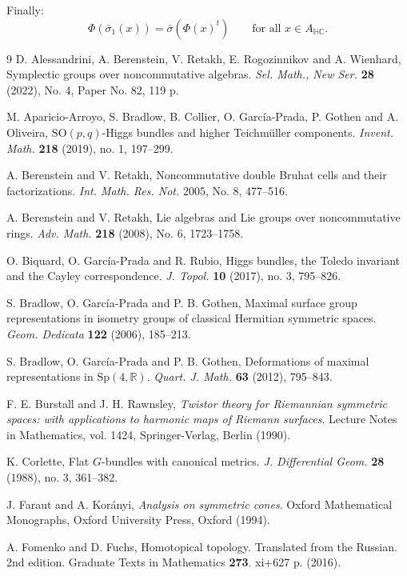 \documentclass[oneside,11pt]{amsart}
\theoremstyle{definition}
\theoremstyle{remark}
\numberwithin{thm}{section}
\numberwithin{equation}{section}
\begin{document}
Finally:
\[
\Phi(\bar\sigma_1(x))
=
\bar\sigma\!\left({\Phi(x)}^{t}\right)
\qquad
\text{for all }x\in A_{\mathbb{HC}}.
\]



\begin{thebibliography}{9}
D. Alessandrini, A. Berenstein, V. Retakh, E. Rogozinnikov and A. Wienhard, Symplectic groups over noncommutative algebras. \emph{Sel. Math., New Ser.} \textbf{28} (2022), No. 4, Paper No. 82, 119 p. 

M. Aparicio-Arroyo, S. Bradlow, B. Collier, O. Garc\'ia-Prada, P. Gothen and A. Oliveira, $\mathrm{SO}(p,q)$-Higgs bundles and higher Teichm\"uller components. \emph{Invent. Math.} \textbf{218} (2019), no. 1, 197--299.

A. Berenstein and V. Retakh, Noncommutative double Bruhat cells and their factorizations. \emph{Int. Math. Res. Not.} 2005, No. 8, 477--516. 

A. Berenstein and V. Retakh, Lie algebras and Lie groups over noncommutative rings. \emph{Adv. Math.} \textbf{218} (2008), No. 6, 1723--1758. 

O. Biquard, O. Garc\'{i}a-Prada and R. Rubio, Higgs bundles, the Toledo invariant and the Cayley correspondence. 
\emph{J. Topol.} \textbf{10} (2017), no. 3, 795--826.

S. Bradlow, O. Garc\'{i}a-Prada and P. B. Gothen, Maximal surface group representations in isometry groups of classical Hermitian symmetric spaces. \emph{Geom. Dedicata} \textbf{122} (2006), 185--213.

S. Bradlow, O. Garc\'{i}a-Prada and P. B. Gothen, Deformations of maximal representations in $\mathrm{Sp}(4, \mathbb{R})$. \emph{Quart. J. Math.} \textbf{63} (2012), 795--843.

F. E. Burstall and J. H. Rawnsley, \emph{Twistor theory for Riemannian symmetric spaces: with applications to harmonic maps of Riemann surfaces}. Lecture Notes in Mathematics, vol. 1424, Springer-Verlag, Berlin (1990).

K. Corlette, Flat $G$-bundles with canonical metrics. \emph{J. Differential Geom.} \textbf{28} (1988), no. 3, 361--382.

J. Faraut and A. Kor\'{a}nyi,  \emph{Analysis on symmetric cones}. Oxford Mathematical Monographs, Oxford University Press, Oxford (1994).

A. Fomenko and D. Fuchs, Homotopical topology. Translated from the Russian. 2nd edition. Graduate Texts in Mathematics \textbf{273}. xi+627 p. (2016). 


\end{thebibliography}
\end{document}
